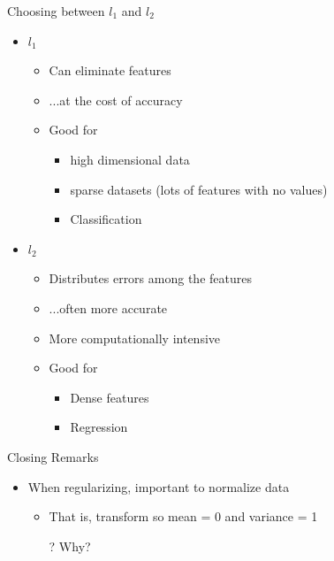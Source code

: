 \documentclass[aspectratio=169]{beamer}
\begin{document}
\begin{frame}{Choosing between $l_1$ and $l_2$} 
	\begin{itemize}
	\item $l_1$
	\begin{itemize}
	\item Can eliminate features
	\item ...at the cost of accuracy
	\item Good for 
	\begin{itemize}
		\item high dimensional data 
		\item sparse datasets (lots of features with no values)
		\item Classification
	\end{itemize}
	\end{itemize}
	\item $l_2$
	\begin{itemize}
	\item Distributes errors among the features
	\item ...often more accurate
	\item More computationally intensive
	\item Good for 
	\begin{itemize}
		\item Dense features
		\item Regression
	\end{itemize}
	\end{itemize}
	\end{itemize}
\end{frame}


\begin{frame}{Closing Remarks}

\begin{itemize}
\item When regularizing, important to normalize data
	\begin{itemize}
	\item That is, transform so mean = 0 and variance = 1
	\item[?] Why?
	\end{itemize}
\end{itemize}
\end{frame}
\end{document}
